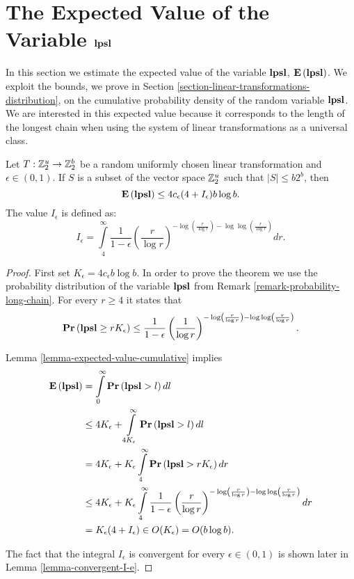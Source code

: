 \section{The Expected Value of the Variable \texorpdfstring{$\mathbf{lpsl}$}{lpsl}}
In this section we estimate the expected value of the variable $\mathbf{lpsl}$, $\mathbf{E}\left(\mathbf{lpsl}\right)$. We exploit the bounds, we prove in Section \ref{section-linear-transformations-distribution}, on the cumulative probability density of the random variable $\mathbf{lpsl}$. We are interested in this expected value because it corresponds to the length of the longest chain when using the system of linear transformations as a universal class.

\begin{theorem}
\label{theorem-n-logn-to-n}
Let $T: \mathbb{Z}_{2}^{u} \rightarrow \mathbb{Z}_{2}^{b}$ be a random uniformly chosen linear transformation and $\epsilon \in (0, 1)$. If $S$ is a subset of the vector space $\mathbb{Z}_{2}^{u}$ such that $|S| \leq b 2 ^ b$, then \[ \mathbf{E}\left(\mathbf{lpsl}\right) \leq 4 c_\epsilon(4 + I_\epsilon) b \log b \text{.} \] The value $I_\epsilon$ is defined as:
\begin{equation}
\label{equality-i-e}
I_\epsilon = \int\limits_4^\infty \frac{1}{1 - \epsilon} \left(\frac{r}{\log r}\right)^{-\log \left(\frac{r}{\log r}\right) - \log \log \left(\frac{r}{\log r}\right)} dr \text{.}
\end{equation}
\end{theorem}
\begin{proof}
First set $K_\epsilon = 4 c_\epsilon b \log b$. In order to prove the theorem we use the probability distribution of the variable $\mathbf{lpsl}$ from Remark \ref{remark-probability-long-chain}. For every $r \geq 4$ it states that 
\[ 
\mathbf{Pr}\left(\mathbf{lpsl} \geq r K_\epsilon\right) \leq \frac{1}{1 - \epsilon}\left(\frac{1}{\log r}\right) ^ {-\log\left(\frac{r}{\log r}\right) - \log \log \left(\frac{r}{\log r}\right)} \text{.} 
\]

Lemma \ref{lemma-expected-value-cumulative} implies 
\[
\begin{split}
\mathbf{E}\left(\mathbf{lpsl}\right)
	& = \int\limits_0^{\infty} \mathbf{Pr}\left(\mathbf{lpsl} > l\right) dl \\
	& \leq 4K_\epsilon + \int\limits_{4K_\epsilon}^\infty \mathbf{Pr}\left(\mathbf{lpsl} > l\right) dl \\
	& = 4K_\epsilon + K_\epsilon \int\limits_4^\infty \mathbf{Pr}\left(\mathbf{lpsl} > rK_\epsilon\right) dr \\
	& \leq 4K_\epsilon + K_\epsilon \int\limits_4^\infty \frac{1}{1 - \epsilon} \left(\frac{r}{\log r}\right)^{-\log \left(\frac{r}{\log r}\right) - \log \log \left(\frac{r}{\log r}\right)} dr \\
	& = K_\epsilon(4 + I_\epsilon) \in O(K_\epsilon) = O(b \log b) \text{.}
\end{split}
\]

The fact that the integral $I_\epsilon$ is convergent for every $\epsilon \in (0, 1)$ is shown later in Lemma \ref{lemma-convergent-I-e}.
\end{proof}

